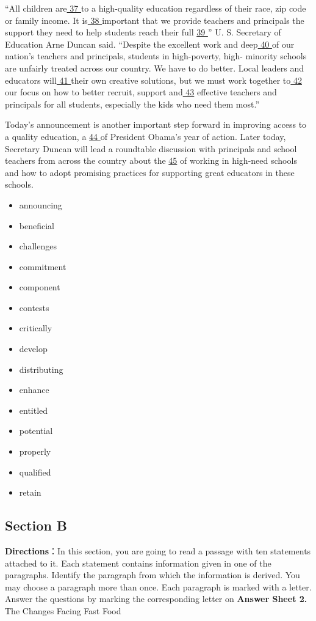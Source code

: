 \documentclass[UTF8,11pt]{ctexart}
\begin{document}
“All children are\uline{ 37 }to a high-quality education regardless of their race, zip code or family income. It is\uline{ 38 }important that we provide teachers and principals the support they need to help students reach their full \uline{39 }” U. S. Secretary of Education Arne Duncan said. “Despite the excellent work and deep\uline{ 40 }of our nation’s teachers and principals, students in high-poverty, high- minority schools are unfairly treated across our country. We have to do better. Local leaders and educators will\uline{ 41 }their own creative solutions, but we must work together to\uline{ 42 }our focus on how to better recruit, support and\uline{ 43} effective teachers and principals for all students, especially the kids who need them most.”


Today’s announcement is another important step forward in improving access to a quality education, a \uline{44 }of President Obama’s year of action. Later today, Secretary Duncan will lead a roundtable discussion with principals and school teachers from across the country about the \uline{45} of working in high-need schools and how to adopt promising practices for supporting great educators in these schools.


\begin{itemize}[leftmargin=2em,itemsep=.2em,topsep=.4em]\item[A.] announcing
\item[B.] beneficial
\item[C.] challenges
\item[D.] commitment
\item[E.] component
\item[F.] contests
\item[G.] critically
\item[H.] develop
\item[I.] distributing
\item[J.] enhance
\item[K.] entitled
\item[L.] potential
\item[M.] properly
\item[N.] qualified
\item[O.] retain
\end{itemize}

\subsection*{Section B}


\textbf{Directions}：In this section, you are going to read a passage with ten statements attached to it. Each statement contains information given in one of the paragraphs. Identify the paragraph from which the information is derived. You may choose a paragraph more than once. Each paragraph is marked with a letter. Answer the questions by marking the corresponding letter on \textbf{Answer Sheet 2.} The Changes Facing Fast Food
\end{document}
